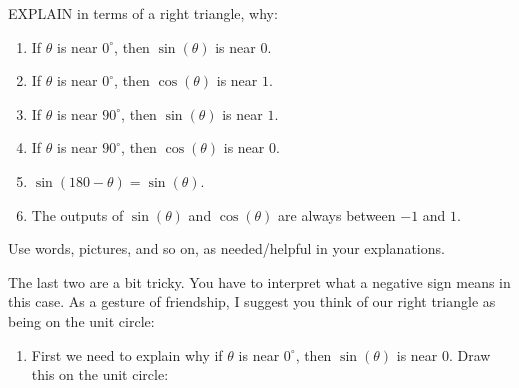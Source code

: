\documentclass[handout,noauthor,nooutcomes,12pt,hints]{ximera}
\begin{document}
\begin{question}
  EXPLAIN in terms of a right triangle, why:
  \begin{enumerate}
  \item If $\theta$ is near $0^\circ$, then $\sin(\theta)$ is near $0$.
  \item If $\theta$ is near $0^\circ$, then $\cos(\theta)$ is near $1$.
  \item If $\theta$ is near $90^\circ$, then $\sin(\theta)$ is near $1$.
  \item If $\theta$ is near $90^\circ$, then $\cos(\theta)$ is near $0$.
  \item $\sin(180-\theta) = \sin(\theta)$.
  \item The outputs of $\sin(\theta)$ and $\cos(\theta)$ are always
    between $-1$ and $1$.
  \end{enumerate}
  Use words, pictures, and so on, as needed/helpful in your
  explanations.
  \begin{hint}
    The last two are a bit tricky. You have to interpret what a
    negative sign means in this case. As a gesture of friendship, I
    suggest you think of our right triangle as being on the unit circle:
    \begin{center}
    \end{center}
  \end{hint}
  \begin{freeResponse}
    \begin{enumerate}
    \item First we need to explain why if $\theta$ is near $0^\circ$,
      then $\sin(\theta)$ is near $0$.  Draw this on the unit circle:
      \begin{center}
\end{center}
\end{enumerate}
\end{freeResponse}
\end{question}
\end{document}
